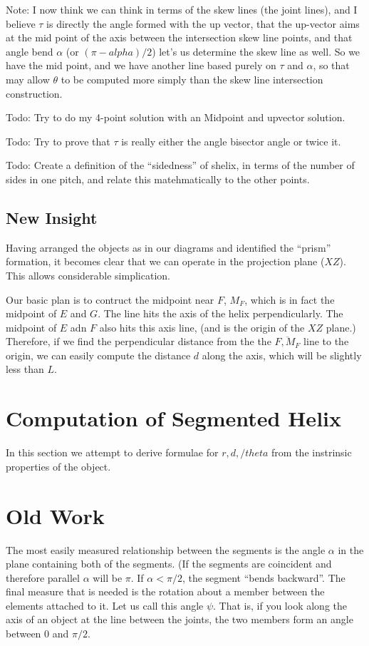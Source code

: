 \documentclass[11pt]{article}
\begin{document}
{Note: I now think we can think in terms of the skew lines (the
joint lines), and I believe $\tau$ is directly the angle
formed with the up vector, that the up-vector aims at
the mid point of the axis between the intersection skew line
points, and that angle bend $\alpha$ (or $(\pi - alpha)/2$)
let's us determine the skew line as well.  So we have
the mid point, and we have another line based purely
on $\tau$ and $\alpha$, so that may allow $\theta$
to be computed more simply than the skew line intersection
construction.

Todo: Try to do my 4-point solution with an Midpoint and
upvector solution.

Todo: Try to prove that $\tau$ is really either the
angle bisector angle or twice it.

Todo: Create a definition of the ``sidedness'' of shelix,
in terms of the number of sides in one pitch, and relate
this matehmatically to the other points.

\subsection{New Insight}

Having arranged the objects as in our diagrams and identified the ``prism'' formation,
it becomes clear that we can operate in the projection plane ($XZ$).
This allows considerable simplication.

Our basic plan is to contruct the midpoint near $F$, $M_F$, which is
in fact the midpoint of $E$ and $G$. The line hits the axis
of the helix perpendicularly. The midpoint of $E$ adn $F$ also
hits this axis line, (and is the origin of the $XZ$ plane.)
Therefore, if we find the perpendicular distance from the the $\overline{F,M_F}$
line to the origin, we can easily compute the distance $d$ along the axis,
which will be slightly less than $L$. 


\section{Computation of Segmented Helix}

In this section we attempt to derive formulae for $r,d,/theta$ from
the instrinsic properties of the object.

\section{Old Work}

The most easily measured relationship between the segments
is the angle $\alpha$ in the plane containing both of the segments. (If the segments are coincident and therefore
parallel $\alpha$ will be $\pi$. If $\alpha < \pi/2$, the segment ``bends backward''.
The final measure that is needed is the rotation about a member between the elements attached to it.
Let us call this angle $\psi$. That is, if you look along the axis of an object at the line
between the joints, the two members form an angle between 0 and $\pi /2$. 

}
\end{document}

